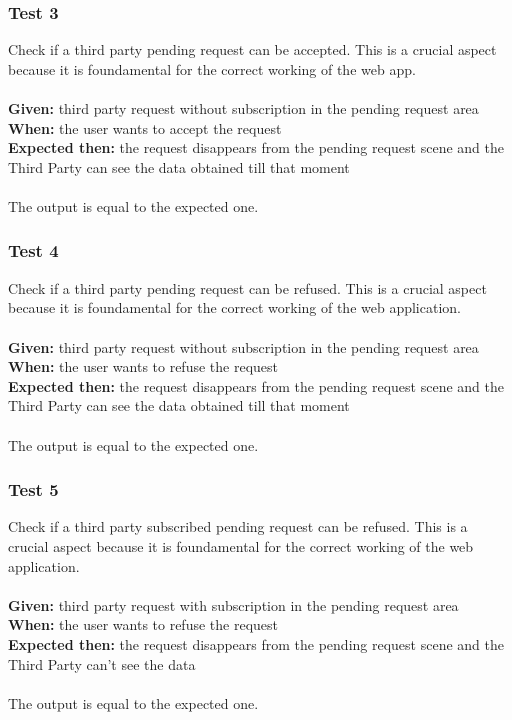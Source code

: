\subsubsection{\Large{Test 3}}
Check if a third party pending request can be accepted. This is a crucial aspect because it is foundamental for the correct working of the web app.\\
\\
\textbf{Given: }  third party request without subscription in the pending request area\\
\textbf{When: } the user wants to accept the request\\
\textbf{Expected then: } the request disappears from the pending request scene and the Third Party can see the data obtained till that moment \\
\\
The output is equal to the expected one.

\subsubsection{\Large{Test 4}}
Check if a third party pending request can be refused. This is a crucial aspect because it is foundamental for the correct working of the web application.\\
\\
\textbf{Given: }  third party request without subscription in the pending request area\\
\textbf{When: } the user wants to refuse the request\\
\textbf{Expected then: } the request disappears from the pending request scene and the Third Party can see the data obtained till that moment  \\
\\
The output is equal to the expected one.

\subsubsection{\Large{Test 5}}
Check if a third party subscribed pending request can be refused. This is a crucial aspect because it is foundamental for the correct working of the web application.\\
\\
\textbf{Given: }  third party request with subscription in the pending request area\\
\textbf{When: } the user wants to refuse the request\\
\textbf{Expected then: } the request disappears from the pending request scene and the Third Party can't see the data\\
\\
The output is equal to the expected one.

